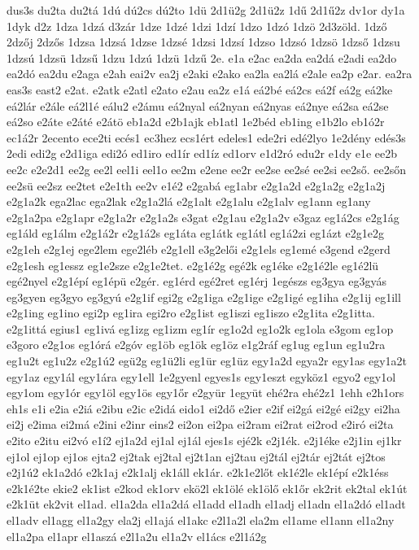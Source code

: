 {dus3s
du2ta
du2tá
1dú
dú2cs
dú2to
1dü
2d1ü2g
2d1ü2z
1dű
2d1ű2z
dv1or
dy1a
1dyk
d2z
1dza
1dzá
d3zár
1dze
1dzé
1dzi
1dzí
1dzo
1dzó
1dzö
2d3zöld.
1dző
2dzőj
2dzős
1dzsa
1dzsá
1dzse
1dzsé
1dzsi
1dzsí
1dzso
1dzsó
1dzsö
1dzső
1dzsu
1dzsú
1dzsü
1dzsű
1dzu
1dzú
1dzü
1dzű
2e.
e1a
e2ac
ea2da
ea2dá
e2adi
ea2do
ea2dó
ea2du
e2aga
e2ah
eai2v
ea2j
e2aki
e2ako
ea2la
ea2lá
e2ale
ea2p
e2ar.
ea2ra
eas3s
east2
e2at.
e2atk
e2atl
e2ato
e2au
ea2z
e1á
eá2bé
eá2cs
eá2f
eá2g
eá2ke
eá2lár
e2ále
eá2l1é
eálu2
e2ámu
eá2nyal
eá2nyan
eá2nyas
eá2nye
eá2sa
eá2se
eá2so
e2áte
e2áté
e2átö
eb1a2d
e2b1ajk
eb1atl
1e2béd
eb1ing
e1b2lo
eb1ó2r
ec1á2r
2ecento
ece2ti
ecés1
ec3hez
ecs1ért
edeles1
ede2ri
edé2lyo
1e2dény
edés3s
2edi
edi2g
e2d1iga
edi2ó
ed1iro
ed1ír
ed1íz
ed1orv
e1d2ró
edu2r
e1dy
e1e
ee2b
ee2c
e2e2d1
ee2g
ee2l
eel1i
eel1o
ee2m
e2ene
ee2r
ee2se
ee2sé
ee2si
ee2ső.
ee2sőn
ee2sü
ee2sz
ee2tet
e2e1th
ee2v
e1é2
e2gabá
eg1abr
e2g1a2d
e2g1a2g
e2g1a2j
e2g1a2k
ega2lac
ega2lak
e2g1a2lá
e2g1alt
e2g1alu
e2g1alv
eg1ann
eg1any
e2g1a2pa
e2g1apr
e2g1a2r
e2g1a2s
e3gat
e2g1au
e2g1a2v
e3gaz
eg1á2cs
e2g1ág
eg1áld
eg1álm
e2g1á2r
e2g1á2s
eg1áta
eg1átk
eg1átl
eg1á2zi
eg1ázt
e2g1e2g
e2g1eh
e2g1ej
ege2lem
ege2léb
e2g1ell
e3g2elői
e2g1els
eg1emé
e3gend
e2gerd
e2g1esh
eg1essz
eg1e2sze
e2g1e2tet.
e2g1é2g
egé2k
eg1éke
e2g1é2le
eg1é2lü
egé2nyel
e2g1épí
eg1épü
e2gér.
eg1érd
egé2ret
eg1érj
1egészs
eg3gya
eg3gyás
eg3gyen
eg3gyo
eg3gyú
e2g1if
egi2g
e2g1iga
e2g1ige
e2g1igé
eg1iha
e2g1ij
eg1ill
e2g1ing
eg1ino
egi2p
eg1ira
egi2ro
e2g1ist
eg1iszi
eg1iszo
e2g1ita
e2g1itta.
e2g1ittá
egius1
eg1ivá
eg1izg
eg1izm
eg1ír
eg1o2d
eg1o2k
eg1ola
e3gom
eg1op
e3goro
e2g1os
eg1órá
e2góv
eg1öb
eg1ök
eg1öz
e1g2ráf
eg1ug
eg1un
eg1u2ra
eg1u2t
eg1u2z
e2g1ú2
egü2g
eg1ü2li
eg1ür
eg1üz
egy1a2d
egya2r
egy1as
egy1a2t
egy1az
egy1ál
egy1ára
egy1ell
1e2gyenl
egyes1s
egy1eszt
egyköz1
egyo2
egy1ol
egy1om
egy1ór
egy1öl
egy1ös
egy1őr
e2gyür
1együt
ehé2ra
ehé2z1
1ehh
e2h1ors
eh1s
e1i
e2ia
e2iá
e2ibu
e2ic
e2idá
eido1
ei2dő
e2ier
e2if
ei2gá
ei2gé
ei2gy
ei2ha
ei2j
e2ima
ei2má
e2ini
e2inr
eins2
ei2on
ei2pa
ei2ram
ei2rat
ei2rod
e2iró
ei2ta
e2ito
e2itu
ei2vó
e1í2
ej1a2d
ej1al
ej1ál
ejes1s
ejé2k
e2j1ék.
e2j1éke
e2j1in
ej1kr
ej1ol
ej1op
ej1os
ejta2
ej2tak
ej2tal
ej2t1an
ej2tau
ej2tál
ej2tár
ej2tát
ej2tos
e2j1ú2
ek1a2dó
e2k1aj
e2k1alj
ek1áll
ek1ár.
e2k1e2lőt
ek1é2le
ek1épí
e2k1éss
e2k1é2te
ekie2
ek1ist
e2kod
ek1orv
ekö2l
ek1ölé
ek1ölő
ek1őr
ek2rit
ek2tal
ek1út
e2k1üt
ek2vit
el1ad.
el1a2da
el1a2dá
el1add
el1adh
el1adj
el1adn
el1a2dó
el1adt
el1adv
el1agg
el1a2gy
ela2j
el1ajá
el1akc
e2l1a2l
ela2m
el1ame
el1ann
el1a2ny
el1a2pa
el1apr
el1aszá
e2l1a2u
el1a2v
el1ács
e2l1á2g
}
